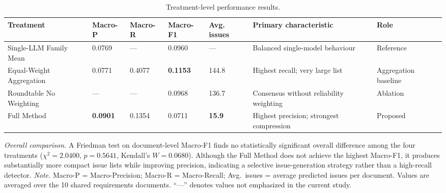 \begin{table}[!ht]
\centering
\caption{Treatment-level performance results.}
\label{tab:treatment_results}
\scriptsize
\setlength{\tabcolsep}{4pt}
\renewcommand{\arraystretch}{1.3}
\begin{tabularx}{\textwidth}{p{1.9cm} p{1.0cm} p{1.0cm} p{1.0cm} p{0.9cm} X p{1.5cm}}
\toprule
\textbf{Treatment} & \textbf{Macro-P} & \textbf{Macro-R} & \textbf{Macro-F1} & \textbf{Avg. issues} & \textbf{Primary characteristic} & \textbf{Role} \\
\midrule
Single-LLM Family Mean & 0.0769 & --- & 0.0960 & --- & Balanced single-model behaviour & Reference \\
Equal-Weight Aggregation & 0.0771 & 0.4077 & \textbf{0.1153} & 144.8 & Highest recall; very large list & Aggregation baseline \\
Roundtable No Weighting & --- & --- & 0.0968 & 136.7 & Consensus without reliability weighting & Ablation \\
Full Method & \textbf{0.0901} & 0.1354 & 0.0711 & \textbf{15.9} & Highest precision; strongest compression & Proposed \\
\bottomrule
\end{tabularx}

\par\vspace{0.4em}
{\footnotesize \textit{Overall comparison.} A Friedman test on document-level Macro-F1 finds no statistically significant overall difference among the four treatments ($\chi^2=2.0400$, $p=0.5641$, Kendall's $W=0.0680$). Although the Full Method does not achieve the highest Macro-F1, it produces substantially more compact issue lists while improving precision, indicating a selective issue-generation strategy rather than a high-recall detector. \textit{Note.} Macro-P = Macro-Precision; Macro-R = Macro-Recall; Avg.\ issues = average predicted issues per document. Values are averaged over the 10 shared requirements documents. ``---'' denotes values not emphasized in the current study.\par}
\end{table}
